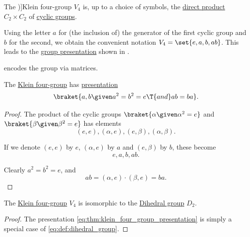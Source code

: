\begin{definition}\label{def:klein_four_group}
  The \term[ru=четверная группа Клейна (\cite[189]{Винберг2014КурсАлгебры})]{Klein four-group} \( V_4 \) is, up to a choice of symbols, the \hyperref[def:fol_direct_product]{direct product} \( C_2 \times C_2 \) of \hyperref[def:cyclic_group]{cyclic groups}.

  Using the letter \( a \) for (the inclusion of) the generator of the first cyclic group and \( b \) for the second, we obtain the convenient notation \( V_4 = \set{ e, a, b, ab } \). This leads to the \hyperref[def:group_presentation]{group presentation} shown in .
\end{definition}
\begin{comments}
  \item {} encodes the group via matrices.
\end{comments}

\begin{proposition}\label{thm:klein_four_group_presentation}
  The \hyperref[def:klein_four_group]{Klein four-group} has \hyperref[def:group_presentation]{presentation}
  \begin{equation}\label{eq:thm:klein_four_group_presentation}
    \braket{ a, b \given a^2 = b^2 = e \T{and} ab = ba }.
  \end{equation}
\end{proposition}
\begin{proof}
  The product of the cyclic groups \( \braket{ \alpha \given \alpha^2 = e } \) and \( \braket{ \beta \given \beta^2 = e } \) has elements
  \begin{equation*}
    (e, e), (\alpha, e), (e, \beta), (\alpha, \beta).
  \end{equation*}

  If we denote \( (e, e) \) by \( e \), \( (\alpha, e) \) by \( a \) and \( (e, \beta) \) by \( b \), these become
  \begin{equation*}
    e, a, b, ab.
  \end{equation*}

  Clearly \( a^2 = b^2 = e \), and
  \begin{equation*}
    ab = (\alpha, e) \cdot (\beta, e) = ba.
  \end{equation*}
\end{proof}

\begin{corollary}\label{thm:klein_four_group_dihedral}
  The \hyperref[def:klein_four_group]{Klein four-group} \( V_4 \) is isomorphic to the \hyperref[def:dihedral_group]{Dihedral group} \( D_2 \).
\end{corollary}
\begin{proof}
  The presentation \eqref{eq:thm:klein_four_group_presentation} is simply a special case of \eqref{eq:def:dihedral_group}.
\end{proof}

